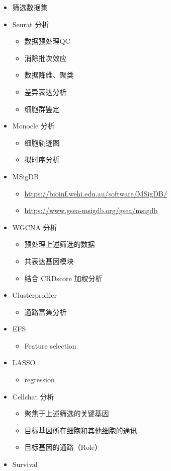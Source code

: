 \documentclass[
]{article}
\providecommand{\tightlist}{%
  \setlength{\itemsep}{0pt}\setlength{\parskip}{0pt}}
\begin{document}
\begin{itemize}
\tightlist
\item
  筛选数据集
\item
  Seurat 分析

  \begin{itemize}
  \tightlist
  \item
    数据预处理QC
  \item
    消除批次效应
  \item
    数据降维、聚类
  \item
    差异表达分析
  \item
    细胞群鉴定
  \end{itemize}
\item
  Monocle 分析

  \begin{itemize}
  \tightlist
  \item
    细胞轨迹图
  \item
    拟时序分析
  \end{itemize}
\item
  MSigDB

  \begin{itemize}
  \tightlist
  \item
    \url{https://bioinf.wehi.edu.au/software/MSigDB/}
  \item
    \url{https://www.gsea-msigdb.org/gsea/msigdb}
  \end{itemize}
\item
  WGCNA 分析

  \begin{itemize}
  \tightlist
  \item
    预处理上述筛选的数据
  \item
    共表达基因模块
  \item
    结合 CRDscore 加权分析
  \end{itemize}
\item
  Clusterprofiler

  \begin{itemize}
  \tightlist
  \item
    通路富集分析
  \end{itemize}
\item
  EFS

  \begin{itemize}
  \tightlist
  \item
    Feature selection
  \end{itemize}
\item
  LASSO

  \begin{itemize}
  \tightlist
  \item
    regression
  \end{itemize}
\item
  Cellchat 分析

  \begin{itemize}
  \tightlist
  \item
    聚焦于上述筛选的关键基因
  \item
    目标基因所在细胞和其他细胞的通讯
  \item
    目标基因的通路（Role）
  \end{itemize}
\item
  Survival
\end{itemize}
\end{document}
